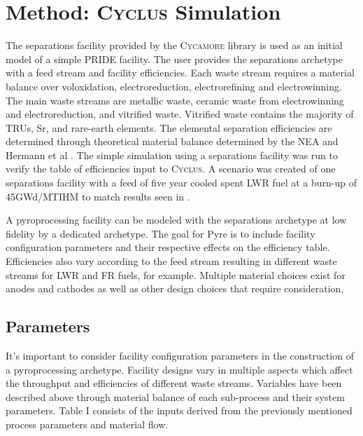 \documentclass{anstrans}
\newcommand{\Cyclus}{\textsc{Cyclus}\xspace}%
\newcommand{\Cycamore}{\textsc{Cycamore}\xspace}%
\begin{document}
\section{Method: \Cyclus Simulation}
The separations facility provided by the \Cycamore library is used as an initial model of a simple PRIDE facility. 
The user provides the separations archetype with a feed stream and facility efficiencies.  
Each waste stream requires a material balance over voloxidation, electroreduction, electrorefining and electrowinning. The main 
waste streams are metallic waste, ceramic waste from electrowinning and electroreduction, and vitrified waste. Vitrified 
waste contains the majority of TRUs, Sr, and rare-earth elements. The elemental separation efficiencies are 
determined through theoretical material balance determined by the NEA and Hermann et al \cite{flowsheet_1998,herrmann_separation_2010}. 
The simple simulation using a separations facility was run to verify the table of efficiencies input to \Cyclus. A scenario was 
created of one separations facility with a feed of five year cooled spent LWR fuel at a burn-up of 45GWd/MTIHM to 
match results seen in \cite{flowsheet_1998}.

A pyroprocessing facility can be modeled with the separations archetype at low fidelity 
by a dedicated archetype. The goal for Pyre is to include facility configuration parameters and 
their respective effects on the efficiency table. Efficiencies also vary according to the feed stream resulting in different 
waste streams for LWR and FR fuels, for example. Multiple material choices exist for anodes and cathodes as well as other 
design choices that require consideration. 

\subsection{Parameters}
It's important to consider facility configuration parameters in the construction of a pyroprocessing archetype. Facility designs vary in 
multiple aspects which affect the throughput and efficiencies of different waste streams. Variables have been described above through material balance of each sub-process and their system parameters. Table I consists of the inputs derived from the previously mentioned process parameters and material flow. 
\end{document}
